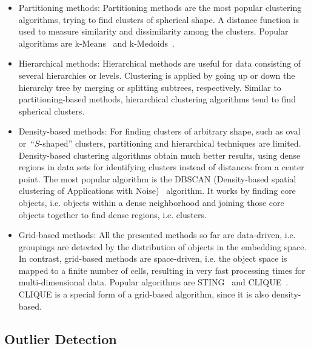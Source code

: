 \begin{itemize} 
\item Partitioning methods: Partitioning methods are the most popular clustering algorithms, trying to find clusters of spherical shape. A distance function is used to measure similarity and dissimilarity among the clusters. Popular algorithms are k-Means~\parencite{Lloyd82} and k-Medoids~\parencite{medoid}. 
\item Hierarchical methods: Hierarchical methods are useful for data consisting of several hierarchies or levels. Clustering is applied by going up or down the hierarchy tree by merging or splitting subtrees, respectively. Similar to partitioning-based methods, hierarchical clustering algorithms tend to find spherical clusters. 
\item Density-based methods: For finding clusters of arbitrary shape, such as oval or~\enquote{$S$-shaped} clusters, partitioning and hierarchical techniques are limited. Density-based clustering algorithms obtain much better results, using dense regions in data sets for identifying clusters instead of distances from a center point. The most popular algorithm is the DBSCAN (Density-based spatial clustering of Applications with Noise)~\parencite{dbscan} algorithm. It works by finding core objects, i.e. objects within a dense neighborhood and joining those core objects together to find dense regions, i.e. clusters.
\item Grid-based methods: All the presented methods so far are data-driven, i.e. groupings are detected by the distribution of objects in the embedding space. In contrast, grid-based methods are space-driven, i.e. the object space is mapped to a finite number of cells, resulting in very fast processing times for multi-dimensional data. Popular algorithms are STING~\parencite{sting} and CLIQUE~\parencite{clique}. CLIQUE is a special form of a grid-based algorithm, since it is also density-based.
\end{itemize}





\subsection{Outlier Detection}

